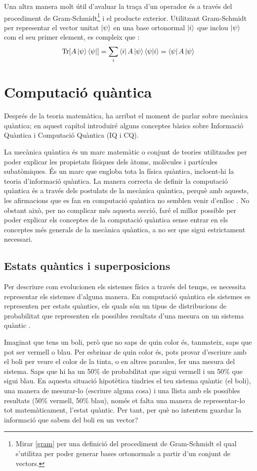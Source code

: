 Una altra manera molt útil d'avaluar la traça d'un operador és a través del procediment de Gram-Schmidt\footnote{Mirar \ref{gram} per una definició del procediment de Gram-Schmidt el qual s'utilitza per poder generar bases ortonormals a partir d'un conjunt de vectors.} i el producte exterior.
Utilitzant Gram-Schmidt per representar el vector unitat $\ket{\psi}$ en una base ortonormal $\ket{i}$ que inclou $\ket{\psi}$ com el seu primer element, es compleix que \cite{QCandQI:trace}:
$$
\Tr[A\ket{\psi}\bra{\psi}] = \sum_i \bra{i}A\ket{\psi}\bra{\psi}\ket{i} = \bra{\psi}A\ket{\psi}
$$

\chapter{Computació quàntica}
Després de la teoria matemàtica, ha arribat el moment de parlar sobre mecànica quàntica; en aquest capítol introduiré alguns conceptes bàsics sobre Informació Quàntica i Computació Quàntica (IQ i CQ).

La mecànica quàntica és un marc matemàtic o conjunt de teories utilitzades per poder explicar les propietats físiques dels àtoms, molècules i partícules subatòmiques. És un marc que engloba tota la física quàntica, incloent-hi la teoria d'informació quàntica. La manera correcta de definir la computació quàntica és a través dels postulats de la mecànica quàntica, perquè amb aquests, les afirmacions que es fan en computació quàntica no semblen venir d'enlloc \cite{QCandQI:QM_postulates}. No obstant això, per no complicar més aquesta secció, faré el millor possible per poder explicar els conceptes de la computació quàntica sense entrar en els conceptes més generals de la mecànica quàntica, a no ser que sigui estrictament necessari.

\section{Estats quàntics i superposicions}
Per descriure com evolucionen els sistemes físics a través del temps, es necessita representar els sistemes d'alguna manera. En computació quàntica els sistemes es representen per estats quàntics, els quals són un tipus de distribucions de probabilitat que representen els possibles resultats d'una mesura on un sistema quàntic \cite{QT_concepts:q_systems}.

Imaginat que tens un boli, però que no saps de quin color és, tanmateix, saps que pot ser vermell o blau. Per esbrinar de quin color és, pots provar d'escriure amb el boli per veure el color de la tinta, o en altres paraules, fer una mesura del sistema. Saps que hi ha un 50\% de probabilitat que sigui vermell i un 50\% que sigui blau. En aquesta situació hipotètica tindries el teu sistema quàntic (el boli), una manera de mesurar-lo (escriure alguna cosa) i una llista amb els possibles resultats (50\% vermell, 50\% blau), només et falta una manera de representar-lo tot matemàticament, l'estat quàntic. Per tant, per què no intentem guardar la informació que sabem del boli en un vector?

